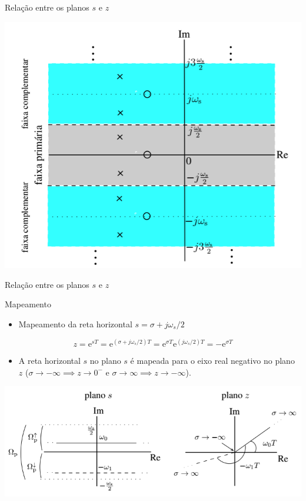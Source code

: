 \begin{frame}{Relação entre os planos $s$ e $z$}
\centerline{\includegraphics[width=0.75\linewidth]{Figuras/Ch05/fig4.PNG}}
\end{frame}

\begin{frame}{Relação entre os planos $s$ e $z$}
\begin{block}{Mapeamento}
\begin{itemize}
	\item Mapeamento da reta horizontal $s = \sigma + j\omega_s/2$
\end{itemize}
$$z = \text{e}^{sT} = \text{e}^{(\sigma + j\omega_s/2)T} = \text{e}^{\sigma T} \text{e}^{(j\omega_s/2) T} = -\text{e}^{\sigma T}$$
\begin{itemize}
	\item A reta horizontal $s$ no plano $s$ é mapeada para o eixo real negativo no plano $z$ ($\sigma \to -\infty \implies z \to 0^{-}$ e $\sigma \to \infty \implies z \to -\infty$).
\end{itemize}
\end{block}
\centerline{\includegraphics[width=0.9\linewidth]{Figuras/Ch05/fig2.PNG}}
\end{frame}

